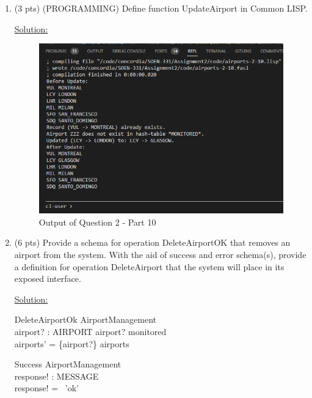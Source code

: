 \documentclass[12pt]{article}
\begin{document}
\begin{spacing}{1.5}
\begin{enumerate}
		\item (3 pts) (PROGRAMMING) Define function UpdateAirport in Common LISP.
		      
		      \underline{Solution:}
		      
		      
		      \begin{figure}[htp]
		      	\centering
		      	\includegraphics[width=1\textwidth]{static/airports-2-10.PNG}
		      	\caption{Output of Question 2 - Part 10}
		      \end{figure}
		      
		      \newpage
		\item (6 pts) Provide a schema for operation DeleteAirportOK that removes an airport
		      from the system. With the aid of success and error schema(s), provide a definition for
		      operation DeleteAirport that the system will place in its exposed interface.
		      
		      \underline{Solution:}
		      
		      \begin{schema}{DeleteAirportOk}
		      	\Delta AirportManagement \\
		      	airport? : AIRPORT
		      	\where
		      	airport? \in monitored \\
		      	airports' = \{airport?\} \ndres  airports
		      \end{schema}
		      
		      \begin{schema}{Success}
		      	\Xi AirportManagement \\
		      	response! : MESSAGE \\
		      	\where
		      	response! = \, 'ok' \\
		      \end{schema}
		      

\end{enumerate}
\end{spacing}
\end{document}
